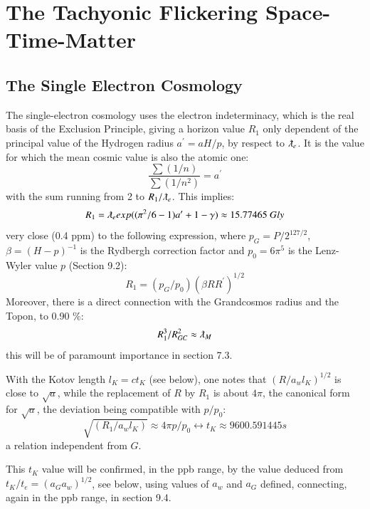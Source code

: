 \documentclass[twoside,draft]{article}
\begin{document}
\begin{sloppypar}
\section{The Tachyonic Flickering Space-Time-Matter}

\subsection{The Single Electron Cosmology}

The single-electron cosmology \cite{Sanchez1} uses the electron indeterminacy, which is the real basis of the Exclusion Principle, giving a horizon value $R_1$ only dependent of the principal value of the Hydrogen radius $a^{\prime} = aH/p$, by respect to $\lambdabar_e$. It is the value for which the mean cosmic value is also the atomic one:
\begin{equation}
\frac{\sum(1/n)}{\sum(1/n^{2})} = a^{\prime}
\end{equation}
with the sum running from 2 to $R_{1} /\lambdabar_{e}$. This implies:
$$
R_{1} = \lambdabar_{e} exp((\pi^{2} /6 - 1)a^{\prime} + 1 - \gamma) \approx 15.77465 ~ Gly
$$
very close (0.4 ppm) to the following expression, where $p_{G} = P/2^{127/2}$, $\beta = (H - p)^{-1}$ is the Rydbergh correction factor and $p_{0} = 6\pi^{5}$ is the Lenz-Wyler value $p$ (Section 9.2):
$$
R_{1} = ( p_{G} /p_{0} )(\beta R R^{\prime})^{1/2}
$$
Moreover, there is a direct connection with the Grandcosmos radius and the Topon, to 0.90 \%:
\begin{equation}
R_1^3/R_{GC}^2 \approx \lambdabar_M  
\end{equation}
this will be of paramount importance in section 7.3.

With the Kotov length $l_{K} = ct_{K}$ (see below), one notes that $(R/a_w l_K)^{1/2} $ is close to $\sqrt{a}$, while the replacement of $R$ by $R_{1}$ is about $4\pi$, the canonical form for $\sqrt{a}$, the deviation being compatible with $p/p_{0}$:
$$\sqrt{(R_{1} /a_{w} l_{K})} \approx 4\pi p/p_{0} \leftrightarrow t_{K} \approx 9 600.591445 s$$ a relation independent from $G$. 

This $t_K$ value will be confirmed, in the ppb range, by the value deduced from $t_{K} /t_{e} = (a_{G} a_{w})^{1/2}$, see below, using values of $a_{w}$ and $a_{G}$ defined, connecting, again in the ppb range, in section 9.4. 


\end{sloppypar}
\end{document}
